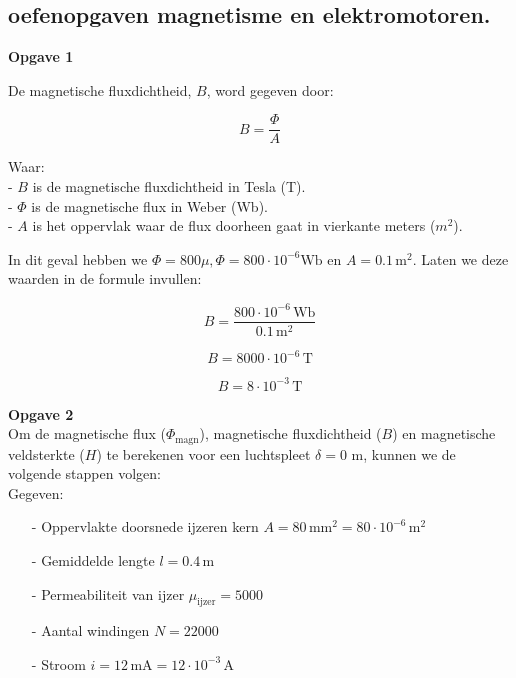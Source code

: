 \subsection{oefenopgaven magnetisme en elektromotoren.}

\textbf{Opgave 1}

De magnetische fluxdichtheid, \( B \), word gegeven door:

\[ B = \frac{\Phi}{A} \]

Waar:\\
- \( B \) is de magnetische fluxdichtheid in Tesla (T).\\
- \( \Phi \) is de magnetische flux in Weber (Wb).\\
- \( A \) is het oppervlak waar de flux doorheen gaat in vierkante meters (\( m^2 \)).

In dit geval hebben we \( \Phi = 800 \mu, \Phi = 800 \cdot 10^{-6} \text{Wb} \) en \( A = 0.1 \, \text{m}^2 \). Laten we deze waarden in de formule invullen:

\[ B = \frac{800 \cdot 10^{-6} \, \text{Wb}}{0.1 \, \text{m}^2} \]

\[ B = 8000 \cdot 10^{-6} \, \text{T} \]

\[ B = 8 \cdot 10^{-3} \, \text{T} \]

\newpage
\textbf{Opgave 2}\\
Om de magnetische flux (\( \Phi_{\text{magn}} \)), magnetische fluxdichtheid (\( B \)) en magnetische veldsterkte (\( H \)) te berekenen voor een luchtspleet \( \delta = 0 \) m, kunnen we de volgende stappen volgen:\\
Gegeven:
\begin{enumerate}
    \item[-] Oppervlakte doorsnede ijzeren kern \( A = 80 \, \text{mm}^2 = 80 \cdot 10^{-6} \, \text{m}^2 \)
    \item[-] Gemiddelde lengte \( l = 0.4 \, \text{m} \)
    \item[-] Permeabiliteit van ijzer \( \mu_{\text{ijzer}} = 5000 \)
    \item[-] Aantal windingen \( N = 22000 \)
    \item[-] Stroom \( i = 12 \, \text{mA} = 12 \cdot 10^{-3} \, \text{A} \)
\end{enumerate}

